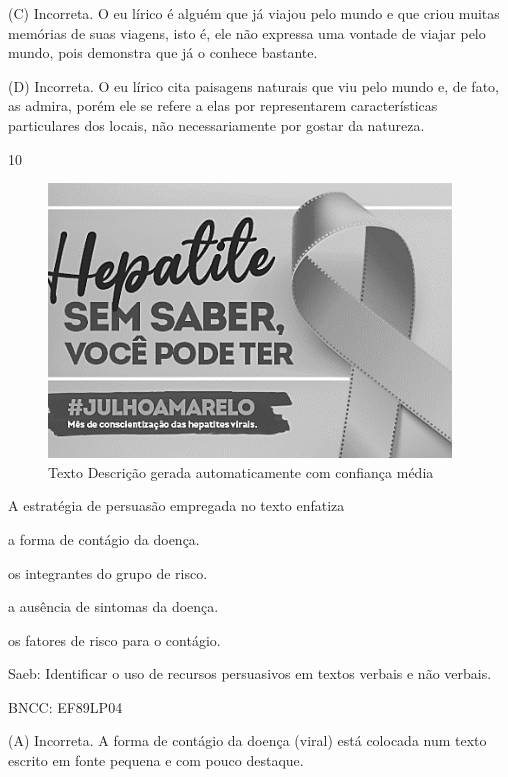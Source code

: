 (C) Incorreta. O eu lírico é alguém que já viajou pelo mundo e que criou
muitas memórias de suas viagens, isto é, ele não expressa uma vontade de
viajar pelo mundo, pois demonstra que já o conhece bastante.

(D) Incorreta. O eu lírico cita paisagens naturais que viu pelo mundo e,
de fato, as admira, porém ele se refere a elas por representarem
características particulares dos locais, não necessariamente por gostar
da natureza.

\num{10}

\begin{figure}
\centering
\includegraphics[width=4.21103in,height=2.86458in]{./imgSAEB_8_POR/media/image31.png}
\caption{Texto Descrição gerada automaticamente com confiança média}
\end{figure}


A estratégia de persuasão empregada no texto enfatiza

\begin{escolha}
\item
  a forma de contágio da doença.
\item
  os integrantes do grupo de risco.
\item
  a ausência de sintomas da doença.
\item
  os fatores de risco para o contágio.
\end{escolha}

Saeb: Identificar o uso de recursos persuasivos em textos verbais e não
verbais.

BNCC: EF89LP04

(A) Incorreta. A forma de contágio da doença (viral) está colocada num
texto escrito em fonte pequena e com pouco destaque.

